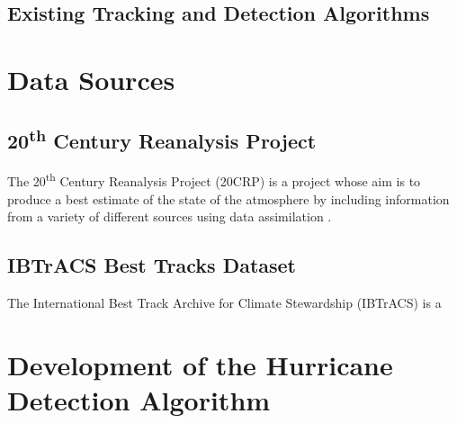 \documentclass[pdftex,12pt,a4paper]{report}
\newcommand{\ts}{\textsuperscript}
\begin{document}

\section{Existing Tracking and Detection Algorithms}



\chapter{Data Sources}

\section{20\ts{th} Century Reanalysis Project}
\label{sec:20crp}
The 20\ts{th} Century Reanalysis Project (20CRP) is a project whose aim is to produce a best estimate of
the state of the atmosphere by including information from a variety of different sources using data
assimilation \parencite{compoTwentieth2011}.

\section{IBTrACS Best Tracks Dataset}
\label{sec:ibtracs}
The International Best Track Archive for Climate Stewardship (IBTrACS)
\parencite{knappInternational2010} is a

\chapter{Development of the Hurricane Detection Algorithm}

\end{document}
